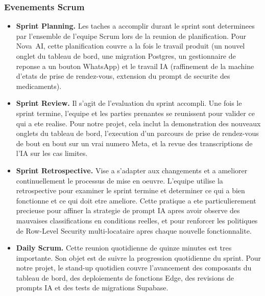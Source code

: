 \subsubsection{Evenements Scrum}
\begin{itemize}
  \item \textbf{Sprint Planning.} Les taches a accomplir durant le sprint
        sont determinees par l'ensemble de l'equipe Scrum lors de la
        reunion de planification. Pour Nova~AI, cette planification couvre
        a la fois le travail produit (un nouvel onglet du tableau de bord,
        une migration Postgres, un gestionnaire de reponse a un bouton
        WhatsApp) et le travail IA (raffinement de la machine d'etats de
        prise de rendez-vous, extension du prompt de securite des
        medicaments).
  \item \textbf{Sprint Review.} Il s'agit de l'evaluation du sprint
        accompli. Une fois le sprint termine, l'equipe et les parties
        prenantes se reunissent pour valider ce qui a ete realise. Pour
        notre projet, cela inclut la demonstration des nouveaux onglets du
        tableau de bord, l'execution d'un parcours de prise de rendez-vous
        de bout en bout sur un vrai numero Meta, et la revue des
        transcriptions de l'IA sur les cas limites.
  \item \textbf{Sprint Retrospective.} Vise a s'adapter aux changements et
        a ameliorer continuellement le processus de mise en oeuvre.
        L'equipe utilise la retrospective pour examiner le sprint termine
        et determiner ce qui a bien fonctionne et ce qui doit etre
        ameliore. Cette pratique a ete particulierement precieuse pour
        affiner la strategie de prompt IA apres avoir observe des
        mauvaises classifications en conditions reelles, et pour
        renforcer les politiques de Row-Level Security multi-locataire
        apres chaque nouvelle fonctionnalite.
  \item \textbf{Daily Scrum.} Cette reunion quotidienne de quinze minutes
        est tres importante. Son objet est de suivre la progression
        quotidienne du sprint. Pour notre projet, le stand-up quotidien
        couvre l'avancement des composants du tableau de bord, des
        deploiements de fonctions Edge, des revisions de prompts IA et
        des tests de migrations Supabase.
\end{itemize}

